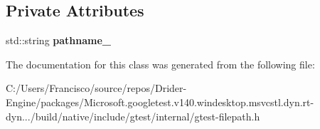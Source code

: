 \subsection*{Private Attributes}
\begin{DoxyCompactItemize}
\item 
\mbox{\label{classtesting_1_1internal_1_1_file_path_a12ce28a0015f85604e0372230fa18d6e}} 
std\+::string {\bfseries pathname\+\_\+}
\end{DoxyCompactItemize}


The documentation for this class was generated from the following file\+:\begin{DoxyCompactItemize}
\item 
C\+:/\+Users/\+Francisco/source/repos/\+Drider-\/\+Engine/packages/\+Microsoft.\+googletest.\+v140.\+windesktop.\+msvcstl.\+dyn.\+rt-\/dyn.../build/native/include/gtest/internal/gtest-\/filepath.\+h\end{DoxyCompactItemize}
